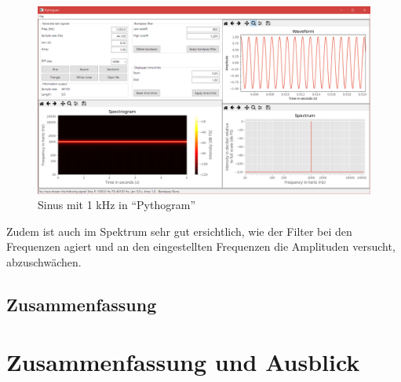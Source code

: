 \documentclass[a4paper]{article}
\begin{document}
\begin{figure}[H]
    \centering
    \begin{minipage}{1.0\textwidth}
        \centering
        \includegraphics[width=1.0\textwidth]{Bandpass_Sine.png}
        \caption{Sinus mit 1 kHz in "`Pythogram"'}
    \end{minipage}
\end{figure}
\noindent
Zudem ist auch im Spektrum sehr gut ersichtlich, wie der Filter bei den Frequenzen agiert und an den eingestellten Frequenzen die Amplituden versucht, abzuschwächen.

\subsection{Zusammenfassung}\label{subsec:zusammenfassung2}

\newpage
\section{Zusammenfassung und Ausblick}\label{sec:zusammenfassungUndAusblick}
\end{document}
